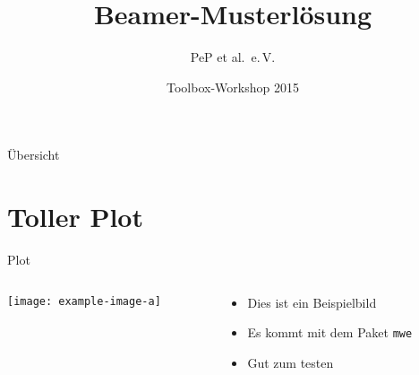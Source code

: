 \documentclass[professionalfonts]{beamer}
\author{PeP et al.\ e.\,V.}
\institute{TU Dortmund}
\date{Toolbox-Workshop 2015}
\title{Beamer-Musterlösung}
\begin{document}
\begin{frame}
  \maketitle
\end{frame}
\begin{frame}{Übersicht}
  \tableofcontents
\end{frame}

\section{Toller Plot}
\begin{frame}{Plot}
  \begin{columns}[c, onlytextwidth]
    \begin{column}{0.47\textwidth}
      \texttt{[image: example-image-a]}
    \end{column}
    \begin{column}{0.47\textwidth}
      \begin{itemize}
        \item Dies ist ein Beispielbild
        \item Es kommt mit dem Paket \texttt{mwe}
        \item Gut zum testen
      \end{itemize}
    \end{column}
  \end{columns} 
\end{frame}
\end{document}
